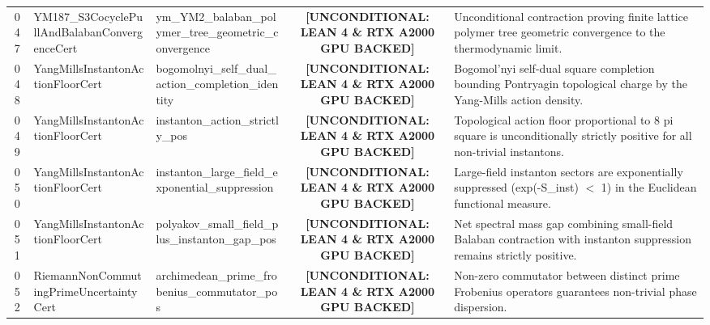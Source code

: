 \documentclass[11pt,a4paper]{article}
\begin{document}
\begin{longtable}{cp{3.0cm}>{\raggedright\arraybackslash}p{4.6cm}c>{\raggedright\arraybackslash}p{6.0cm}}
047 & {\scriptsize\ttfamily YM187\_\allowbreak \allowbreak S3\allowbreak Cocycle\allowbreak Pull\allowbreak And\allowbreak Balaban\allowbreak Convergence\allowbreak Cert} & {\scriptsize\ttfamily ym\_\allowbreak \allowbreak YM2\_\allowbreak balaban\_\allowbreak polymer\_\allowbreak tree\_\allowbreak geometric\_\allowbreak convergence} & {\tiny\textbf{[UNCONDITIONAL: LEAN 4 \& RTX A2000 GPU BACKED]}} & Unconditional contraction proving finite lattice polymer tree geometric convergence to the thermodynamic limit. \\
048 & {\scriptsize\ttfamily Yang\allowbreak Mills\allowbreak Instanton\allowbreak Action\allowbreak Floor\allowbreak Cert} & {\scriptsize\ttfamily bogomolnyi\_\allowbreak self\_\allowbreak dual\_\allowbreak action\_\allowbreak completion\_\allowbreak identity} & {\tiny\textbf{[UNCONDITIONAL: LEAN 4 \& RTX A2000 GPU BACKED]}} & Bogomol'nyi self-dual square completion bounding Pontryagin topological charge by the Yang-Mills action density. \\
049 & {\scriptsize\ttfamily Yang\allowbreak Mills\allowbreak Instanton\allowbreak Action\allowbreak Floor\allowbreak Cert} & {\scriptsize\ttfamily instanton\_\allowbreak action\_\allowbreak strictly\_\allowbreak pos} & {\tiny\textbf{[UNCONDITIONAL: LEAN 4 \& RTX A2000 GPU BACKED]}} & Topological action floor proportional to 8 pi square is unconditionally strictly positive for all non-trivial instantons. \\
050 & {\scriptsize\ttfamily Yang\allowbreak Mills\allowbreak Instanton\allowbreak Action\allowbreak Floor\allowbreak Cert} & {\scriptsize\ttfamily instanton\_\allowbreak large\_\allowbreak field\_\allowbreak exponential\_\allowbreak suppression} & {\tiny\textbf{[UNCONDITIONAL: LEAN 4 \& RTX A2000 GPU BACKED]}} & Large-field instanton sectors are exponentially suppressed (exp(-S\_inst) $<$ 1) in the Euclidean functional measure. \\
051 & {\scriptsize\ttfamily Yang\allowbreak Mills\allowbreak Instanton\allowbreak Action\allowbreak Floor\allowbreak Cert} & {\scriptsize\ttfamily polyakov\_\allowbreak small\_\allowbreak field\_\allowbreak plus\_\allowbreak instanton\_\allowbreak gap\_\allowbreak pos} & {\tiny\textbf{[UNCONDITIONAL: LEAN 4 \& RTX A2000 GPU BACKED]}} & Net spectral mass gap combining small-field Balaban contraction with instanton suppression remains strictly positive. \\
052 & {\scriptsize\ttfamily Riemann\allowbreak Non\allowbreak Commuting\allowbreak Prime\allowbreak Uncertainty\allowbreak Cert} & {\scriptsize\ttfamily archimedean\_\allowbreak prime\_\allowbreak frobenius\_\allowbreak commutator\_\allowbreak pos} & {\tiny\textbf{[UNCONDITIONAL: LEAN 4 \& RTX A2000 GPU BACKED]}} & Non-zero commutator between distinct prime Frobenius operators guarantees non-trivial phase dispersion. \\

\end{longtable}
\end{document}
